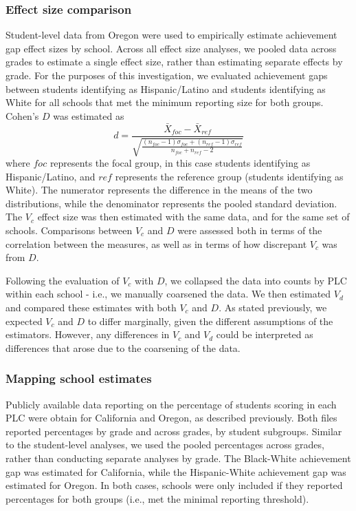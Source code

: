 \documentclass[man, fleqn, noextraspace]{apa6}
\theoremstyle{definition}
\theoremstyle{definition}
\theoremstyle{definition}
\theoremstyle{remark}
\begin{document}
\hypertarget{effect-size-comparison}{%
\subsubsection{Effect size comparison}\label{effect-size-comparison}}

Student-level data from Oregon were used to empirically estimate
achievement gap effect sizes by school. Across all effect size analyses,
we pooled data across grades to estimate a single effect size, rather
than estimating separate effects by grade. For the purposes of this
investigation, we evaluated achievement gaps between students
identifying as Hispanic/Latino and students identifying as White for all
schools that met the minimum reporting size for both groups. Cohen's
\(D\) was estimated as \begin{equation}
d = \frac{\bar{X}_{foc} - \bar{X}_{ref}}
        {\sqrt{\frac{(n_{foc} - 1)\sigma_{foc} + (n_{ref} - 1)\sigma_{ref}}
                  {n_{foc} + n_{ref} - 2}}}
\end{equation} where \(foc\) represents the focal group, in this case
students identifying as Hispanic/Latino, and \(ref\) represents the
reference group (students identifying as White). The numerator
represents the difference in the means of the two distributions, while
the denominator represents the pooled standard deviation. The \(V_c\)
effect size was then estimated with the same data, and for the same set
of schools. Comparisons between \(V_c\) and \(D\) were assessed both in
terms of the correlation between the measures, as well as in terms of
how discrepant \(V_c\) was from \(D\).

Following the evaluation of \(V_c\) with \(D\), we collapsed the data
into counts by PLC within each school - i.e., we manually coarsened the
data. We then estimated \(V_d\) and compared these estimates with both
\(V_c\) and \(D\). As stated previously, we expected \(V_c\) and \(D\)
to differ marginally, given the different assumptions of the estimators.
However, any differences in \(V_c\) and \(V_d\) could be interpreted as
differences that arose due to the coarsening of the data.

\hypertarget{mapping-school-estimates}{%
\subsubsection{Mapping school
estimates}\label{mapping-school-estimates}}

Publicly available data reporting on the percentage of students scoring
in each PLC were obtain for California and Oregon, as described
previously. Both files reported percentages by grade and across grades,
by student subgroups. Similar to the student-level analyses, we used the
pooled percentages across grades, rather than conducting separate
analyses by grade. The Black-White achievement gap was estimated for
California, while the Hispanic-White achievement gap was estimated for
Oregon. In both cases, schools were only included if they reported
percentages for both groups (i.e., met the minimal reporting threshold).
\end{document}
